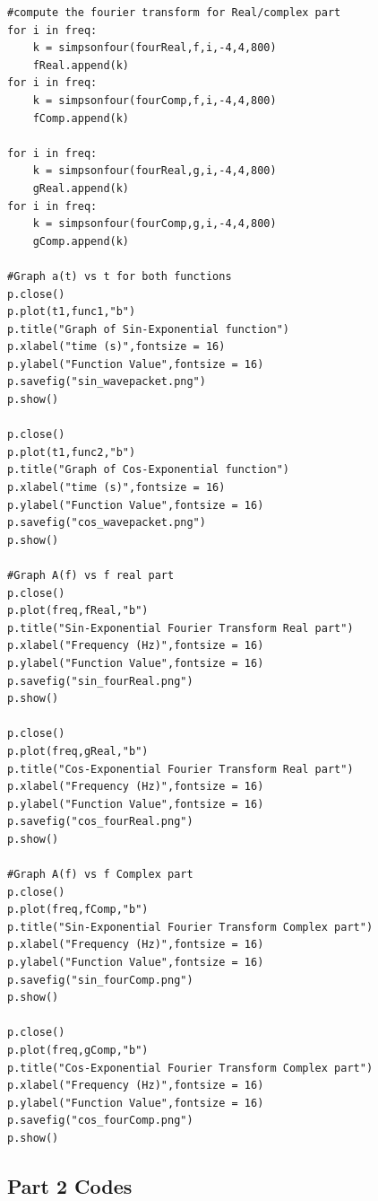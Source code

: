 \documentclass[11pt]{article}
\begin{document}
\begin{verbatim}
#compute the fourier transform for Real/complex part
for i in freq:
    k = simpsonfour(fourReal,f,i,-4,4,800)
    fReal.append(k)   
for i in freq:
    k = simpsonfour(fourComp,f,i,-4,4,800)
    fComp.append(k)
    
for i in freq:
    k = simpsonfour(fourReal,g,i,-4,4,800)
    gReal.append(k)
for i in freq:
    k = simpsonfour(fourComp,g,i,-4,4,800)
    gComp.append(k)
    
#Graph a(t) vs t for both functions
p.close()
p.plot(t1,func1,"b")
p.title("Graph of Sin-Exponential function")
p.xlabel("time (s)",fontsize = 16)
p.ylabel("Function Value",fontsize = 16)
p.savefig("sin_wavepacket.png")
p.show()

p.close()
p.plot(t1,func2,"b")
p.title("Graph of Cos-Exponential function")
p.xlabel("time (s)",fontsize = 16)
p.ylabel("Function Value",fontsize = 16)
p.savefig("cos_wavepacket.png")
p.show()

#Graph A(f) vs f real part
p.close()
p.plot(freq,fReal,"b")
p.title("Sin-Exponential Fourier Transform Real part")
p.xlabel("Frequency (Hz)",fontsize = 16)
p.ylabel("Function Value",fontsize = 16)
p.savefig("sin_fourReal.png")
p.show()

p.close()
p.plot(freq,gReal,"b")
p.title("Cos-Exponential Fourier Transform Real part")
p.xlabel("Frequency (Hz)",fontsize = 16)
p.ylabel("Function Value",fontsize = 16)
p.savefig("cos_fourReal.png")
p.show()

#Graph A(f) vs f Complex part
p.close()
p.plot(freq,fComp,"b")
p.title("Sin-Exponential Fourier Transform Complex part")
p.xlabel("Frequency (Hz)",fontsize = 16)
p.ylabel("Function Value",fontsize = 16)
p.savefig("sin_fourComp.png")
p.show()

p.close()
p.plot(freq,gComp,"b")
p.title("Cos-Exponential Fourier Transform Complex part")
p.xlabel("Frequency (Hz)",fontsize = 16)
p.ylabel("Function Value",fontsize = 16)
p.savefig("cos_fourComp.png")
p.show()

\end{verbatim}

\subsection{Part 2 Codes}
\end{document}
